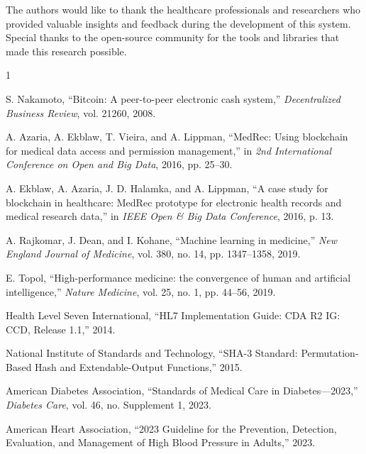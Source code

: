 \documentclass[conference]{IEEEtran}
\begin{document}
The authors would like to thank the healthcare professionals and researchers who provided valuable insights and feedback during the development of this system. Special thanks to the open-source community for the tools and libraries that made this research possible.

\begin{thebibliography}{1}

 S. Nakamoto, ``Bitcoin: A peer-to-peer electronic cash system,'' \textit{Decentralized Business Review}, vol. 21260, 2008.

 A. Azaria, A. Ekblaw, T. Vieira, and A. Lippman, ``MedRec: Using blockchain for medical data access and permission management,'' in \textit{2nd International Conference on Open and Big Data}, 2016, pp. 25--30.

 A. Ekblaw, A. Azaria, J. D. Halamka, and A. Lippman, ``A case study for blockchain in healthcare: MedRec prototype for electronic health records and medical research data,'' in \textit{IEEE Open \& Big Data Conference}, 2016, p. 13.

 A. Rajkomar, J. Dean, and I. Kohane, ``Machine learning in medicine,'' \textit{New England Journal of Medicine}, vol. 380, no. 14, pp. 1347--1358, 2019.

 E. Topol, ``High-performance medicine: the convergence of human and artificial intelligence,'' \textit{Nature Medicine}, vol. 25, no. 1, pp. 44--56, 2019.

 Health Level Seven International, ``HL7 Implementation Guide: CDA\textregistered{} R2 IG: CCD, Release 1.1,'' 2014.

 National Institute of Standards and Technology, ``SHA-3 Standard: Permutation-Based Hash and Extendable-Output Functions,'' 2015.

 American Diabetes Association, ``Standards of Medical Care in Diabetes---2023,'' \textit{Diabetes Care}, vol. 46, no. Supplement 1, 2023.

 American Heart Association, ``2023 Guideline for the Prevention, Detection, Evaluation, and Management of High Blood Pressure in Adults,'' 2023.

\end{thebibliography}
\end{document}
